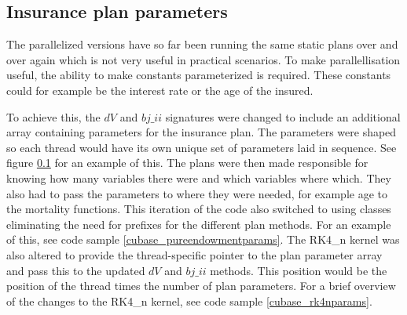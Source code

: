 \begin{table}[h!]
\centering
{}
\caption{F\# Alea.cuBase calculations per ms with double precision\label{table:cubaseManualdoubletime}}
\end{table}

\subsection{Insurance plan parameters}
The parallelized versions have so far been running the same static plans over and over again which is not very useful in practical scenarios.
To make parallellisation useful, the ability to make constants parameterized is required.
These constants could for example be the interest rate or the age of the insured.

To achieve this, the $dV$ and $bj\_ii$ signatures were changed to include an additional array containing parameters for the insurance plan.
The parameters were shaped so each thread would have its own unique set of parameters laid in sequence. 
See figure \ref{} for an example of this.
The plans were then made responsible for knowing how many variables there were and which variables where which. 
They also had to pass the parameters to where they were needed, for example age to the mortality functions.
This iteration of the code also switched to using classes eliminating the need for prefixes for the different plan methods.
For an example of this, see code sample \ref{cubase_pureendowmentparams}.
The RK4\_n kernel was also altered to provide the thread-specific pointer to the plan parameter array and pass this to the updated $dV$ and $bj\_ii$ methods.
This position would be the position of the thread times the number of plan parameters.
For a brief overview of the changes to the RK4\_n kernel, see code sample \ref{cubase_rk4nparams}.


